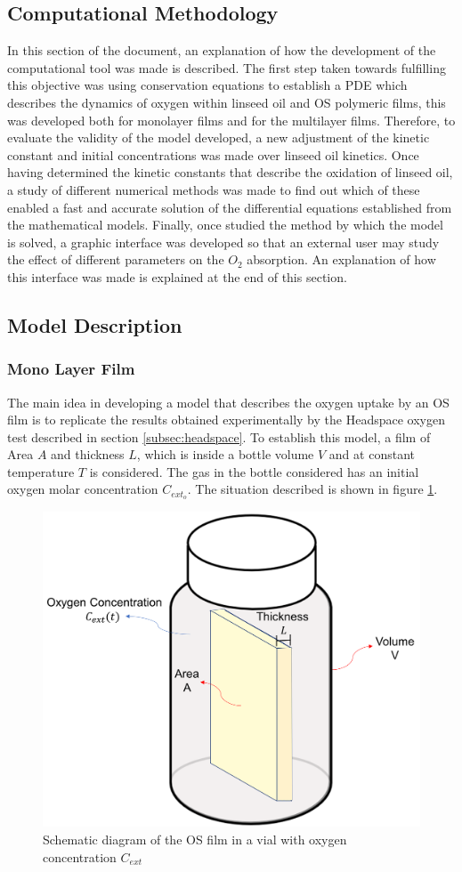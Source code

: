 \begin{refsection}
\section{Computational Methodology}\label{sec:computational methodology}
In this section of the document, an explanation of how the development of the computational tool was made is described. The first step taken towards fulfilling this objective was using conservation equations to establish a PDE which describes the dynamics of oxygen within linseed oil and OS polymeric films, this was developed both for monolayer films and for the multilayer films. Therefore, to evaluate the validity of the model developed, a new adjustment of the kinetic constant and initial concentrations was made over linseed oil kinetics. Once having determined the kinetic constants that describe the oxidation of linseed oil, a study of different numerical methods was made to find out which of these enabled a fast and accurate solution of the differential equations established from the mathematical models. Finally, once studied the method by which the model is solved, a graphic interface was developed so that an external user may study the effect of different parameters on the $O_2$ absorption. An explanation of how this interface was made is explained at the end of this section. 

\subsection{Model Description}\label{subsec:model_desc.}

\subsubsection{Mono Layer Film}
The main idea in developing a model that describes the oxygen uptake by an OS film is to replicate the results obtained experimentally by the Headspace oxygen test described in section \ref{subsec:headspace}. To establish this model, a film of Area $A$ and thickness $L$, which is inside a bottle volume $V$ and at constant temperature $T$ is considered. The gas in the bottle considered has an initial oxygen molar concentration $C_{ext_o}$. The situation described is shown in figure \ref{fig:model_diagram}. 

\begin{figure}[ht]
    \centering
    \includegraphics[width=0.5\linewidth]{Documento_Latex/Imagenes/modelo.png}
    \caption{Schematic diagram of the OS film in a vial with oxygen concentration $C_{ext}$}
    \label{fig:model_diagram}
\end{figure}


\end{refsection}
